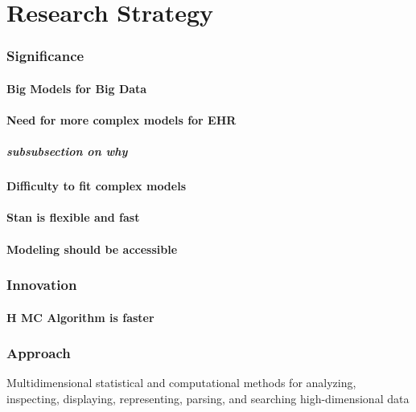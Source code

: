 \documentclass[11pt,notitlepage]{article}
\begin{document}
\part*{Research Strategy}
\section*{Significance}

\subsection*{Big Models for Big Data}

\subsection*{Need for more complex models for EHR}

\subsubsection*{subsubsection on why}

\subsection*{Difficulty to fit complex models}

\subsection*{Stan is flexible and fast}

\subsection*{Modeling should be accessible}

\section*{Innovation}

\subsection*{H MC Algorithm is faster}

\section*{Approach}
Multidimensional statistical and computational methods for analyzing, inspecting, displaying, representing, parsing, and searching high-dimensional data
\end{document}
